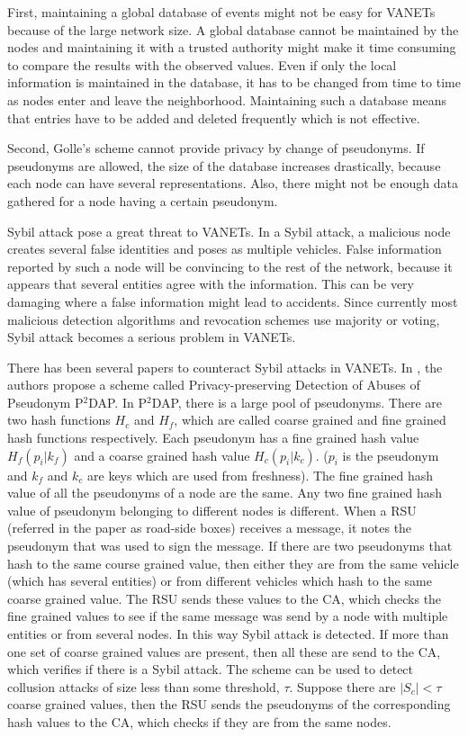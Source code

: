\documentclass[conference]{IEEEtran}[10pt]
\begin{document}
First, maintaining a global database of events  might not be easy for VANETs because of the large network size. 
A global database cannot be maintained by the nodes and maintaining it with
a trusted authority might make it time consuming to compare the results with the observed values. 
Even if only the local information is maintained in the database, it has to be changed from time to time
as nodes enter and leave the neighborhood. 
Maintaining such a database means that entries have to be added and deleted frequently which is not effective. 

Second, Golle's scheme cannot provide privacy by change of pseudonyms. 
If pseudonyms are allowed, the size of the database increases drastically, because each node can have several representations.
Also, there might not be enough data gathered for a node having a certain pseudonym. 

Sybil attack \cite{D02} pose a great threat to VANETs.
In a Sybil attack, a malicious node creates several false identities and poses as multiple vehicles. 
False information reported by such a node will be convincing to the rest of the network, because
it appears that several entities agree with the information. 
This can be very damaging where a false information might lead to accidents. 
Since currently most malicious detection algorithms and revocation schemes use majority or voting, 
Sybil attack becomes a serious problem in VANETs. 

There has been several papers to counteract Sybil attacks  in VANETs. 
In \cite{ZCNC07}, the authors propose a scheme called Privacy-preserving Detection of Abuses of Pseudonym P$^2$DAP. 
In P$^2$DAP, there is a large pool of pseudonyms. 
There are two hash functions $H_c$ and $H_f$, which are  called coarse grained and fine grained hash functions respectively. 
Each pseudonym has a fine grained hash value $H_f(p_i|k_f)$ and a coarse grained hash value $H_c(p_i|k_c)$.
($p_i$ is the pseudonym and $k_f$ and $k_c$ are keys which are used from freshness). 
The fine grained hash value of all the pseudonyms of a node are the same. 
Any two fine grained hash value of pseudonym belonging to different nodes is different. 
When a RSU (referred in the paper as road-side boxes) receives a message, it notes the pseudonym that was used to
sign the message. 
If there are two pseudonyms that hash to the same course grained value, then either they are from the same vehicle (which
has several entities) or from different vehicles which hash to the same coarse grained value. 
The RSU sends these values to the CA, which checks the fine grained values to see if the same message
was send by a node with multiple entities or from several nodes.  
In this way Sybil attack is detected. 
If more than one set of coarse grained values are present, then all these are send to the CA, which verifies if there is a Sybil attack. 
The scheme can be used to detect collusion attacks of size less than some threshold, $\tau$. 
Suppose there are $|S_c| < \tau$ coarse grained values, 
then the RSU sends the pseudonyms of the corresponding hash values to the CA, which checks if they are from the same nodes. 
\end{document}
